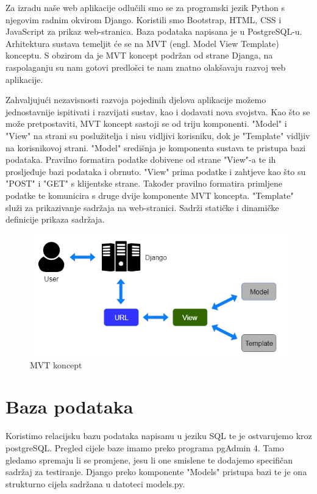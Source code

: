 		Za izradu naše web aplikacije odlučili smo se za programski jezik Python s njegovim radnim okvirom Django. Koristili smo Bootstrap, HTML, CSS i JavaScript za prikaz web-stranica. Baza podataka napisana je u PostgreSQL-u. Arhitektura sustava temeljit će se na MVT (engl. Model View Template) konceptu. S obzirom da je MVT koncept podržan od strane Djanga, na raspolaganju su nam gotovi predlošci te nam znatno olakšavaju razvoj web aplikacije.
	
		Zahvaljujući nezavisnosti razvoja pojedinih djelova aplikacije možemo jednostavnije ispitivati i razvijati sustav, kao i dodavati nova svojstva. Kao što se može pretpostaviti, MVT koncept sastoji se od triju komponenti. "Model" i "View" na strani su poslužitelja i nisu vidljivi korisniku, dok je "Template" vidljiv na korisnikovoj strani. "Model" središnja je komponenta sustava te pristupa bazi podataka. Pravilno formatira podatke dobivene od strane "View"-a te ih prosljeđuje bazi podataka i obrnuto. "View" prima podatke i zahtjeve kao što su "POST" i "GET" s klijentske strane. Također pravilno formatira primljene podatke te komunicira s druge dvije komponente MVT koncepta. "Template" služi za prikazivanje sadržaja na web-stranici. Sadrži statičke i dinamičke definicije prikaza sadržaja.
		
		\begin{figure} [!h] %
			\centering
			\includegraphics[width=0.7\linewidth]{slike/MVT}
			\caption{MVT koncept}
			\label{fig:mvt}
		\end{figure}
		
		

				
		\section{Baza podataka}
			
		Koristimo relacijsku bazu podataka napisanu u jeziku SQL te je ostvarujemo kroz postgreSQL. Pregled cijele baze imamo preko programa pgAdmin 4. Tamo gledamo spremaju li se promjene, jesu li one smislene te dodajemo specifičan sadržaj za testiranje. Django preko komponente "Models" pristupa bazi te je ona strukturno cijela sadržana u datoteci models.py.
		
